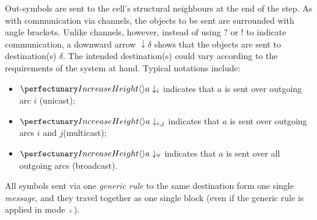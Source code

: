 Out-symbols  are sent to the cell's structural neighbours at the end of the step.
As with communication via channels, the objects to be sent are surrounded with angle brackets.  Unlike channels, however, instead of using \(?\) or \(!\) to indicate communication, a downward arrow \(\downarrow\delta\) shows that the objects are sent to destination(s) \(\delta\).  The intended destination(s) could vary according to the requirements of the system at hand.
Typical notations include: 

\begin{itemize}
\item \(\cpoutsymbol{a}{i}\) indicates that \(a\) is sent over outgoing arc \(i\) (unicast); 

\item \(\cpoutsymbol{a}{i,j}\) indicates that \(a\) is sent over outgoing arcs \(i\) and \(j\)(multicast); 

\item \(\cpoutsymbolall{a}\) indicates that \(a\) is sent over all outgoing arcs (broadcast). 
\end{itemize}

All symbols sent via one \emph{generic rule} to the same destination form one single \emph{message}, and they travel together as one single block (even if the generic rule is applied in mode \({\scriptstyle +}\)).


